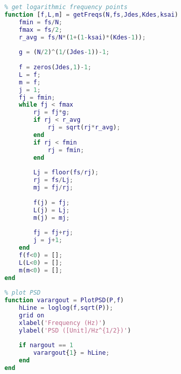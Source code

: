 \begin{lstlisting}[language=Matlab]
    %% Subfunctions
    % get logarithmic frequency points
    function [f,L,m] = getFreqs(N,fs,Jdes,Kdes,ksai)
        fmin = fs/N;
        fmax = fs/2;
        r_avg = fs/N*(1+(1-ksai)*(Kdes-1));
        
        g = (N/2)^(1/(Jdes-1))-1;
        
        f = zeros(Jdes,1)-1;
        L = f;
        m = f;
        j = 1;
        fj = fmin;
        while fj < fmax
            rj = fj*g;
            if rj < r_avg
                rj = sqrt(rj*r_avg);
            end
            if rj < fmin
                rj = fmin;
            end
            
            Lj = floor(fs/rj);
            rj = fs/Lj;
            mj = fj/rj;
            
            f(j) = fj;
            L(j) = Lj;
            m(j) = mj;
            
            fj = fj+rj;
            j = j+1;
        end
        f(f<0) = [];
        L(L<0) = [];
        m(m<0) = [];
    end
    
    % plot PSD
    function varargout = PlotPSD(P,f)
        hLine = loglog(f,sqrt(P));
        grid on
        xlabel('Frequency (Hz)')
        ylabel('PSD ([Unit]/Hz^{1/2})')
        
        if nargout == 1
            varargout{1} = hLine;
        end
    end
\end{lstlisting}